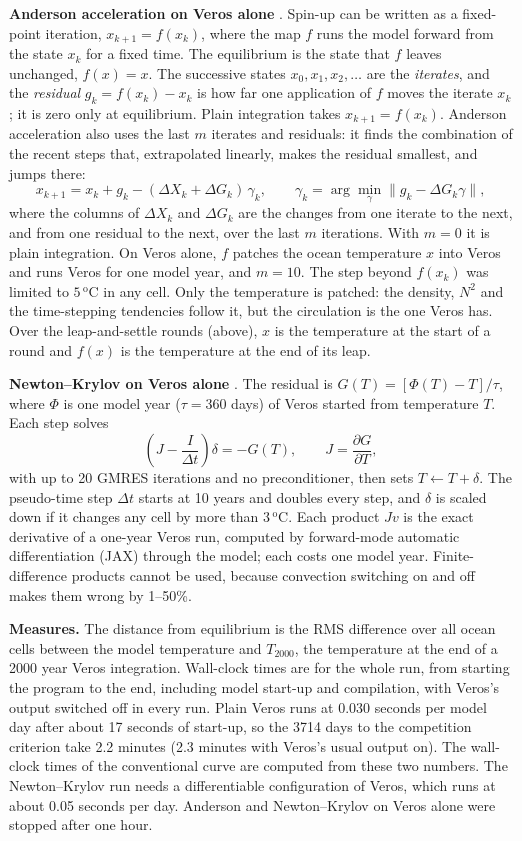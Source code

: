 \documentclass{article}
\begin{document}
\textbf{Anderson acceleration on Veros alone} \cite{walkerni2011,khatiwala2024}. Spin-up can be written as a fixed-point iteration, $x_{k+1}=f(x_k)$, where the map $f$ runs the model forward from the state $x_k$ for a fixed time. The equilibrium is the state that $f$ leaves unchanged, $f(x)=x$. The successive states $x_0, x_1, x_2, \dots$ are the \emph{iterates}, and the \emph{residual} $g_k = f(x_k)-x_k$ is how far one application of $f$ moves the iterate $x_k$; it is zero only at equilibrium. Plain integration takes $x_{k+1}=f(x_k)$. Anderson acceleration also uses the last $m$ iterates and residuals: it finds the combination of the recent steps that, extrapolated linearly, makes the residual smallest, and jumps there:
\[
x_{k+1} = x_k + g_k - (\Delta X_k + \Delta G_k)\,\gamma_k, \qquad \gamma_k = \arg\min_\gamma \lVert g_k - \Delta G_k\gamma\rVert,
\]
where the columns of $\Delta X_k$ and $\Delta G_k$ are the changes from one iterate to the next, and from one residual to the next, over the last $m$ iterations. With $m=0$ it is plain integration. On Veros alone, $f$ patches the ocean temperature $x$ into Veros and runs Veros for one model year, and $m=10$. The step beyond $f(x_k)$ was limited to $5\,^{\text{o}}$C in any cell. Only the temperature is patched: the density, $N^2$ and the time-stepping tendencies follow it, but the circulation is the one Veros has. Over the leap-and-settle rounds (above), $x$ is the temperature at the start of a round and $f(x)$ is the temperature at the end of its leap.

\textbf{Newton--Krylov on Veros alone} \cite{knollkeyes2004,merliskhatiwala2008,bernsen2008}. The residual is $G(T)=[\Phi(T)-T]/\tau$, where $\Phi$ is one model year ($\tau = 360$ days) of Veros started from temperature $T$. Each step solves
\[
\left(J - \frac{I}{\Delta t}\right)\delta = -G(T), \qquad J = \frac{\partial G}{\partial T},
\]
with up to 20 GMRES iterations \cite{saadschultz1986} and no preconditioner, then sets $T \leftarrow T+\delta$. The pseudo-time step $\Delta t$ starts at 10 years and doubles every step, and $\delta$ is scaled down if it changes any cell by more than $3\,^{\text{o}}$C. Each product $Jv$ is the exact derivative of a one-year Veros run, computed by forward-mode automatic differentiation (JAX) through the model; each costs one model year. Finite-difference products cannot be used, because convection switching on and off makes them wrong by 1--50\%.

\textbf{Measures.} The distance from equilibrium is the RMS difference over all ocean cells between the model temperature and $T_{2000}$, the temperature at the end of a 2000 year Veros integration. Wall-clock times are for the whole run, from starting the program to the end, including model start-up and compilation, with Veros's output switched off in every run. Plain Veros runs at 0.030 seconds per model day after about 17 seconds of start-up, so the 3714 days to the competition criterion take 2.2 minutes (2.3 minutes with Veros's usual output on). The wall-clock times of the conventional curve are computed from these two numbers. The Newton--Krylov run needs a differentiable configuration of Veros, which runs at about 0.05 seconds per day. Anderson and Newton--Krylov on Veros alone were stopped after one hour.
\end{document}
